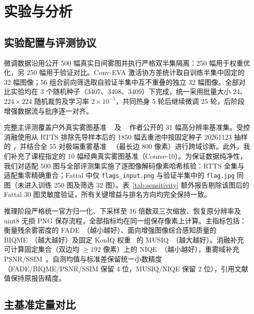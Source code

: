 \documentclass[10pt,twocolumn,letterpaper]{article}
\begin{document}
\section{实验与分析}
\subsection{实验配置与评测协议}
微调数据沿用公开 500 幅真实日间雾图并执行严格双半集隔离：250 幅用于权重优化，另 250 幅用于验证对比。Conv-EVA 激活协方差统计取自训练半集中固定的 32 幅图像；56 组合前向筛选取自验证半集中互不重叠的独立 32 幅图像。全部对比实验均在 3 个随机种子（3407、3408、3409）下完成，统一采用批量大小 24、$224\times 224$ 随机裁剪及学习率 $2\times 10^{-5}$，共同热身 5 轮后继续微调 25 轮，后阶段增强数据流与批序逐一对齐。

完整主评测覆盖户外真实雾图基准 \rtts~\cite{reside2019} 及 \fattal~\cite{fattal2014} 作者公开的 31 幅高分辨率基准集。受控消融使用从 RTTS 排除先导样本后的 1850 幅去重池中按固定种子 20261123 抽样的 \rttssub，并结合全 55 对极端重雾基准 \dense~\cite{dense2019}（最长边 800 像素）进行跨域诊断。此外，我们补充了课程指定的 10 幅经典真实雾图基准（Course-10）。为保证数据纯净性，我们对适配 500 图与全部评测集实施了逐图像解码像素哈希核验：RTTS 全集与适配集零精确重合；Fattal 中仅 \texttt{flags\_input.png} 与验证半集中的 \texttt{flag.jpg} 同图（未进入训练 250 图及筛选 32 图）。表~\ref{tab:sensitivity} 额外报告剔除该图后的 Fattal 30 图灵敏度验证，所有关键增益与排名方向均完全保持一致。

推理阶段严格统一官方归一化、下采样至 16 倍数双三次缩放、恢复原分辨率及 uint8 无损 PNG 保存流程，全部指标均在同一组保存像素上计算。主指标包括：衡量残余雾密度的 FADE~\cite{fade2015}（越小越好）、面向增强图像综合感知质量的 BIQME~\cite{biqme2018}（越大越好）及固定 KonIQ 权重~\cite{koniq2020} 的 MUSIQ~\cite{musiq2021}（越大越好）。消融补充可计算固定集合（双边均 $\ge 192$ 像素）上的 NIQE~\cite{niqe2013}（越小越好），重雾域补充 PSNR/SSIM~\cite{ssim2004}。自测均值与标准差保留统一小数精度（FADE/BIQME/PSNR/SSIM 保留 4 位，MUSIQ/NIQE 保留 2 位），引用文献值保持原报告精度。

\subsection{主基准定量对比}
\begin{table}[t]
\centering\small\setlength{\tabcolsep}{2pt}

\caption{RTTS 全集（$n=4322$）与 Fattal（$n=31$）基准定量对比。$\dagger$ 引自 BiLaLoRA 原文~\cite{bilalora2026}；其余行均在同一输入集与无损 PNG 口径下统一重评，最后两行报告三随机种子均值$\pm$标准差。与分别标识列最优与次优（黑白打印下仍可通过粗体/下划线清晰区分）。完整 20 行对照与辅助熵指标见补表 S1，剔除重合图检验见表~\ref{tab:sensitivity}。}
\label{tab:main}
\end{table}
\end{document}
